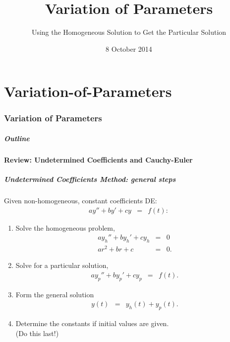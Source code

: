 \part{Variation-of-Parameters}
\section{Variation of Parameters}

\title{Variation of Parameters}
\subtitle{Using the Homogeneous Solution to Get the Particular Solution}
\date{8 October 2014}

\begin{frame}
  \titlepage
\end{frame}

\begin{frame}
  \frametitle{Outline}
  \tableofcontents[ currentsection ]
\end{frame}

\subsection{Review: Undetermined Coefficients and Cauchy-Euler}

\begin{frame}
  \frametitle{Undetermined Coefficients Method: general steps}

  Given non-homogeneous, constant coefficients DE:
  \begin{eqnarray*}
    a y'' + by' + cy & = & f(t):
  \end{eqnarray*}
  \vspace{-0.5cm}
  \begin{enumerate}
  \item Solve the homogeneous problem,
    {\color{blue}\begin{eqnarray*}
      a y_h'' + by_h' + cy_h & = & 0\\
      a r^2 + br + c & = & 0.
    \end{eqnarray*}}
  \vspace{-0.5cm}
  \item Solve for a particular solution,
    {\color{blue}\begin{eqnarray*}
      a y_p'' + by_p' + cy_p & = & f(t).
    \end{eqnarray*}}
  \item Form the general solution
   {\color{red} \begin{eqnarray*}
      y(t) & = & y_h(t) + y_p(t).
    \end{eqnarray*}}
  \item Determine the constants if initial values are given. \\
    (Do this last!)
  \end{enumerate}


\end{frame}

